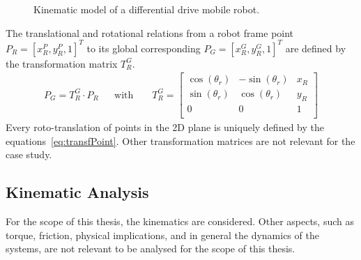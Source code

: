 \begin{figure}[!ht]
  \caption{Kinematic model of a differential drive mobile robot.}
  \label{fig:TikzKine}
\end{figure}

The translational and rotational relations from a robot frame point $P_R=[x_R^P,y_R^P,1]^T$ to its global corresponding $P_G=[x_R^G,y_R^G,1]^T$ are defined by the transformation matrix $T^G_R$.
\begin{align}
P_{G} = T^G_R \cdot P_{R} && \text{with } && T^G_R =
\begin{bmatrix}
\cos(\theta_r) & -\sin(\theta_r) & x_R \\
\sin(\theta_r) & \cos(\theta_r) & y_R \\
0 & 0 & 1 \\
\end{bmatrix}
\label{eq:transfPoint}
\end{align}
Every roto-translation of points in the \gls{2D} plane is uniquely defined by the equations~\ref{eq:transfPoint}.  
Other transformation matrices are not relevant for the case study.


\subsection{Kinematic Analysis}
\label{ssec:kin_a}
\noindent
For the scope of this thesis, the kinematics are considered. Other aspects, such as torque, friction, physical implications, and in general the dynamics of the systems, are not relevant to be analysed for the scope of this thesis.

